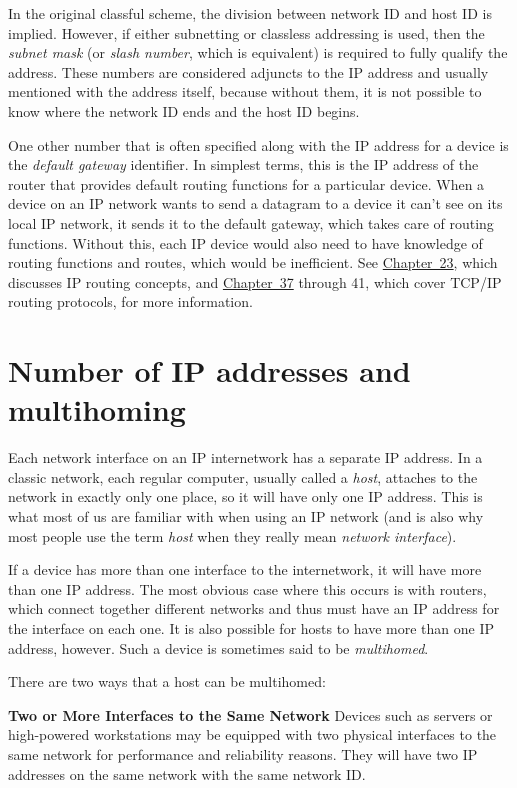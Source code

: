 In the original classful scheme, the division between network ID and host ID is
implied.
However, if either subnetting or classless addressing is used, then the {\emph{subnet mask}} (or {\emph{slash number}}, which is equivalent) is required to fully qualify the address.
These numbers are considered adjuncts to the IP address and usually mentioned with the address itself, because without them, it is not possible to know where the network ID ends and the host ID begins.

One other number that is often specified along with the IP address for a device is the \emph{default gateway} identifier.
In simplest terms, this is the IP address of the
router that provides default routing functions for a particular device.
When a device on an IP network wants to send a datagram to a device it
can't see on its local IP network, it sends it to the default gateway,
which takes care of routing functions. Without this, each IP device
would also need to have knowledge of routing functions and routes, which
would be inefficient. See \protect\hyperlink{ch23.html}{Chapter~23},
which discusses IP routing concepts, and
\protect\hyperlink{ch37.html}{Chapter~37} through 41, which cover TCP/IP
routing protocols, for more information.


\section{Number of IP addresses and multihoming}
Each network interface on an IP internetwork has a separate IP address.
In a classic network, each regular computer, usually called a
\emph{host}, attaches to the network in exactly only one place, so it
will have only one IP address. This is what most of us are familiar with
when using an IP network (and is also why most people use the term
\emph{host} when they really mean {\emph{network interface}}).

If a device has more than one interface to the internetwork, it will
have more than one IP address. The most obvious case where this occurs
is with routers, which connect together different networks and thus must
have an IP address for the interface on each one. It is also possible
for hosts to have more than one IP address, however. Such a device is
sometimes said to be \emph{multihomed}.

There are two ways that a host can be multihomed:

{\textbf{Two or More Interfaces to the Same Network}} Devices such as
servers or high-powered workstations may be equipped with two physical
interfaces to the same network for performance and reliability reasons.
They will have two IP addresses on the same network with the same
network ID.

